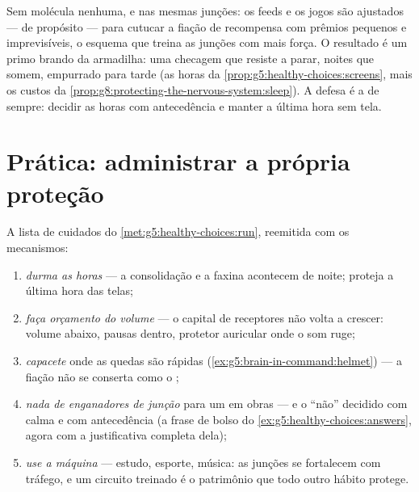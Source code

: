 \begin{example}\label{ex:g8:protecting-the-nervous-system:screens}
Sem molécula nenhuma, e nas mesmas junções: os feeds e os jogos são
ajustados --- de propósito --- para cutucar a fiação de recompensa com
prêmios pequenos e imprevisíveis, o esquema que treina as junções com
mais força. O resultado é um primo brando da armadilha: uma checagem
que resiste a parar, noites que somem,  empurrado para tarde (as
horas da \cref{prop:g5:healthy-choices:screens}, mais os custos da
\cref{prop:g8:protecting-the-nervous-system:sleep}). A defesa é a de
sempre: decidir as horas com antecedência e manter a última hora sem
tela.
\end{example}

\section{Prática: administrar a própria proteção}

\begin{method}\label{met:g8:protecting-the-nervous-system:manual}
A lista de cuidados do \cref{met:g5:healthy-choices:run}, reemitida
com os mecanismos:
\begin{enumerate}
  \item \emph{durma as horas} --- a consolidação e a faxina acontecem
        de noite; proteja a última hora das telas;
  \item \emph{faça orçamento do volume} --- o capital de receptores
        não volta a crescer: volume abaixo, pausas dentro, protetor
        auricular onde o som ruge;
  \item \emph{capacete} onde as quedas são rápidas
        (\cref{ex:g5:brain-in-command:helmet}) --- a fiação não se
        conserta como o ;
  \item \emph{nada de enganadores de junção} para um  em obras
        --- e o ``não'' decidido com calma e com antecedência (a frase
        de bolso do \cref{ex:g5:healthy-choices:answers}, agora com a
        justificativa completa dela);
  \item \emph{use a máquina} --- estudo, esporte, música: as junções
        se fortalecem com tráfego, e um circuito treinado é o
        patrimônio que todo outro hábito protege.
\end{enumerate}
\end{method}

